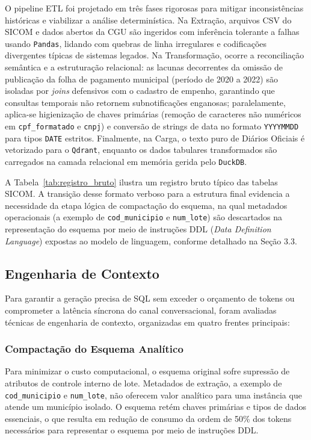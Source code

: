 \documentclass[12pt]{article}
\begin{document}
O pipeline ETL foi projetado em três fases rigorosas para mitigar inconsistências históricas e viabilizar a análise determinística. Na Extração, arquivos CSV do SICOM e dados abertos da CGU são ingeridos com inferência tolerante a falhas usando \texttt{Pandas}, lidando com quebras de linha irregulares e codificações divergentes típicas de sistemas legados. Na Transformação, ocorre a reconciliação semântica e a estruturação relacional: as lacunas decorrentes da omissão de publicação da folha de pagamento municipal (período de 2020 a 2022) são isoladas por \textit{joins} defensivos com o cadastro de empenho, garantindo que consultas temporais não retornem subnotificações enganosas; paralelamente, aplica-se higienização de chaves primárias (remoção de caracteres não numéricos em \texttt{cpf\_formatado} e \texttt{cnpj}) e conversão de strings de data no formato \texttt{YYYYMMDD} para tipos \texttt{DATE} estritos. Finalmente, na Carga, o texto puro de Diários Oficiais é vetorizado para o \texttt{Qdrant}, enquanto os dados tabulares transformados são carregados na camada relacional em memória gerida pelo \texttt{DuckDB}.

A Tabela~\ref{tab:registro_bruto} ilustra um registro bruto típico das tabelas SICOM. A transição desse formato verboso para a estrutura final evidencia a necessidade da etapa lógica de compactação do esquema, na qual metadados operacionais (a exemplo de \texttt{cod\_municipio} e \texttt{num\_lote}) são descartados na representação do esquema por meio de instruções DDL (\textit{Data Definition Language}) expostas ao modelo de linguagem, conforme detalhado na Seção 3.3.



\subsection{Engenharia de Contexto}

Para garantir a geração precisa de SQL sem exceder o orçamento de tokens ou comprometer a latência síncrona do canal conversacional, foram avaliadas técnicas de engenharia de contexto, organizadas em quatro frentes principais:

\subsubsection*{Compactação do Esquema Analítico}
Para minimizar o custo computacional, o esquema original sofre supressão de atributos de controle interno de lote. Metadados de extração, a exemplo de \texttt{cod\_municipio} e \texttt{num\_lote}, não oferecem valor analítico para uma instância que atende um município isolado. O esquema retém chaves primárias e tipos de dados essenciais, o que resulta em redução de consumo da ordem de 50\% dos tokens necessários para representar o esquema por meio de instruções DDL.
\end{document}
